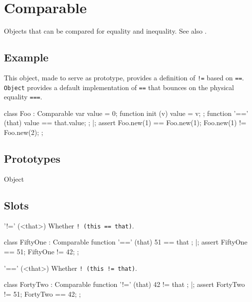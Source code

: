 
\section{Comparable}
Objects that can be compared for equality and inequality.  See also
.

\subsection{Example}
This object, made to serve as prototype, provides a definition of
\lstinline{!=} based on \lstinline{==}.  \lstinline{Object} provides a
default implementation of \lstinline{==} that bounces on the physical
equality \lstinline{===}.

\begin{urbiscript}[firstnumber=1]
class Foo : Comparable
{
  var value = 0;
  function init (v)    { value = v; };
  function '==' (that) { value == that.value; };
}|;
assert
{
  Foo.new(1) == Foo.new(1);
  Foo.new(1) != Foo.new(2);
};
\end{urbiscript}

\subsection{Prototypes}
\begin{refObjects}
\item[Object]
\end{refObjects}


\subsection{Slots}

\begin{urbiscriptapi}
\item['!='](<that>)%
  Whether \lstinline|! (this == that)|.

\begin{urbiscript}
class FiftyOne : Comparable
{
  function '==' (that) { 51 == that };
}|;
assert
{
  FiftyOne == 51;
  FiftyOne != 42;
};
\end{urbiscript}


\item['=='](<that>)
  Whether \lstinline|! (this != that)|.
\begin{urbiscript}
class FortyTwo : Comparable
{
  function '!=' (that) { 42 != that };
}|;
assert
{
  FortyTwo != 51;
  FortyTwo == 42;
};
\end{urbiscript}
\end{urbiscriptapi}

